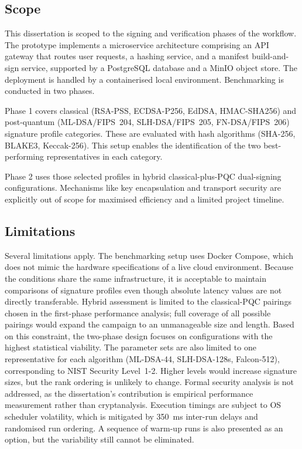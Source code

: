 \documentclass[12pt,a4paper]{article}
\begin{document}
\subsection{Scope}

This dissertation is scoped to the signing and verification phases of the workflow. The prototype implements a microservice architecture comprising an API gateway that routes user requests, a hashing service, and a manifest build-and-sign service, supported by a PostgreSQL database and a MinIO object store. The deployment is handled by a containerised local environment. Benchmarking is conducted in two phases. 

Phase 1 covers classical (RSA-PSS, ECDSA-P256, EdDSA, HMAC-SHA256) and post-quantum (ML-DSA/FIPS~204, SLH-DSA/FIPS~205, FN-DSA/FIPS~206) signature profile categories. These are evaluated with hash algorithms (SHA-256, BLAKE3, Keccak-256). This setup enables the identification of the two best-performing representatives in each category. 

Phase 2 uses those selected profiles in hybrid classical-plus-PQC dual-signing configurations. Mechanisms like key encapsulation and transport security are explicitly out of scope for maximised efficiency and a limited project timeline.

\subsection{Limitations}

Several limitations apply. The benchmarking setup uses Docker Compose, which does not mimic the hardware specifications of a live cloud environment. Because the conditions share the same infrastructure, it is acceptable to maintain comparisons of signature profiles even though absolute latency values are not directly transferable. Hybrid assessment is limited to the classical-PQC pairings chosen in the first-phase performance analysis; full coverage of all possible pairings would expand the campaign to an unmanageable size and length. Based on this constraint, the two-phase design focuses on configurations with the highest statistical viability. The parameter sets are also limited to one representative for each algorithm (ML-DSA-44, SLH-DSA-128s, Falcon-512), corresponding to NIST Security Level~1-2. Higher levels would increase signature sizes, but the rank ordering is unlikely to change. Formal security analysis is not addressed, as the dissertation's contribution is empirical performance measurement rather than cryptanalysis. Execution timings are subject to OS scheduler volatility, which is mitigated by 350~ms inter-run delays and randomised run ordering. A sequence of warm-up runs is also presented as an option, but the variability still cannot be eliminated.
\end{document}
